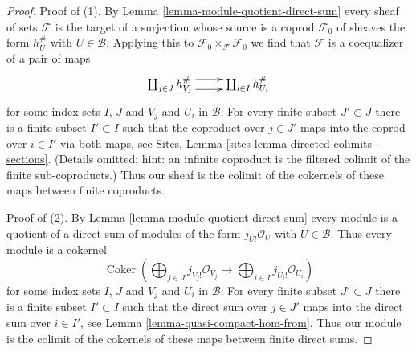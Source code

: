 \documentclass[10pt,a4paper]{amsart}
\theoremstyle{plain}
\theoremstyle{definition}
\theoremstyle{remark}
\numberwithin{equation}{subsection}
\def\Coker{\mathop{\mathrm{Coker}}}
\begin{document}
\begin{proof}
Proof of (1). By Lemma \ref{lemma-module-quotient-direct-sum}
every sheaf of sets $\mathcal{F}$ is the target of a surjection
whose source is a coprod $\mathcal{F}_0$
of sheaves the form $h_{U}^\#$ with $U \in \mathcal{B}$.
Applying this to $\mathcal{F}_0 \times_\mathcal{F} \mathcal{F}_0$
we find that $\mathcal{F}$ is a coequalizer of a pair of maps
$$
\xymatrix{
\coprod\nolimits_{j \in J} h_{V_j}^\#
\ar@<1ex>[r] \ar@<-1ex>[r] &
\coprod\nolimits_{i \in I} h_{U_i}^\#
}
$$
for some index sets $I$, $J$ and $V_j$ and $U_i$ in $\mathcal{B}$.
For every finite subset $J' \subset J$ there is a finite subset
$I' \subset I$ such that the coproduct over $j \in J'$ maps into
the coprod over $i \in I'$ via both maps, see
Sites, Lemma \ref{sites-lemma-directed-colimits-sections}.
(Details omitted; hint: an infinite coproduct is the filtered colimit
of the finite sub-coproducts.)
Thus our sheaf is the colimit of the cokernels of these maps
between finite coproducts.

\medskip\noindent
Proof of (2).
By Lemma \ref{lemma-module-quotient-direct-sum}
every module is a quotient of a direct sum of modules of the form
$j_{U!}\mathcal{O}_U$ with $U \in \mathcal{B}$. Thus every module
is a cokernel
$$
\Coker\left(
\bigoplus\nolimits_{j \in J} j_{V_j!}\mathcal{O}_{V_j}
\longrightarrow
\bigoplus\nolimits_{i \in I} j_{U_i!}\mathcal{O}_{U_i}
\right)
$$
for some index sets $I$, $J$ and $V_j$ and $U_i$ in $\mathcal{B}$.
For every finite subset $J' \subset J$ there is a finite subset
$I' \subset I$ such that the direct sum over $j \in J'$ maps into
the direct sum over $i \in I'$, see
Lemma \ref{lemma-quasi-compact-hom-from}.
Thus our module is the colimit of the cokernels of these maps
between finite direct sums.
\end{proof}
\end{document}
